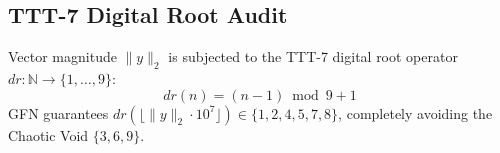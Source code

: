 \subsection{TTT-7 Digital Root Audit}
Vector magnitude $\|y\|_2$ is subjected to the TTT-7 digital root operator $dr: \mathbb{N} \to \{1, \dots, 9\}$:
\begin{equation}
    dr(n) = (n - 1) \bmod 9 + 1
\end{equation}
GFN guarantees $dr(\lfloor \|y\|_2 \cdot 10^7 \rfloor) \in \{1, 2, 4, 5, 7, 8\}$, completely avoiding the Chaotic Void $\{3, 6, 9\}$.